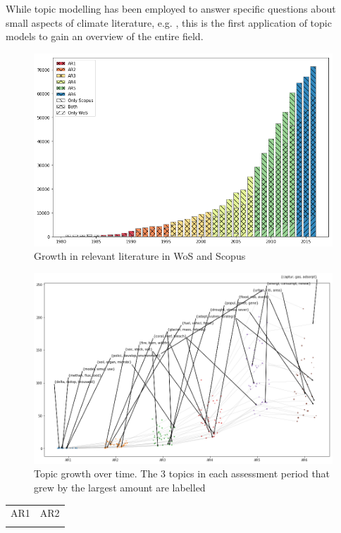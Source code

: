 \documentclass{article}
\begin{document}
While topic modelling has been employed to answer specific questions about small aspects of climate literature, e.g. \citep[e.g.][]{minx2016negative,Grubert2016}, this is the first application of topic models to gain an overview of the entire field.



\begin{figure}
	\includegraphics[width=\linewidth]{plots/wos_scopus_docs_time}
    \caption{Growth in relevant literature in WoS and Scopus}
    \label{growth}
\end{figure}


\begin{figure}
	\includegraphics[width=\linewidth]{plots/hot_topics}
    \caption{Topic growth over time. The 3 topics in each assessment period that grew by the largest amount are labelled}
\end{figure}

\begin{table}
\begin{tabular}{cc}
AR1 & AR2 \\

&

\end{tabular}
\end{table}
\end{document}
